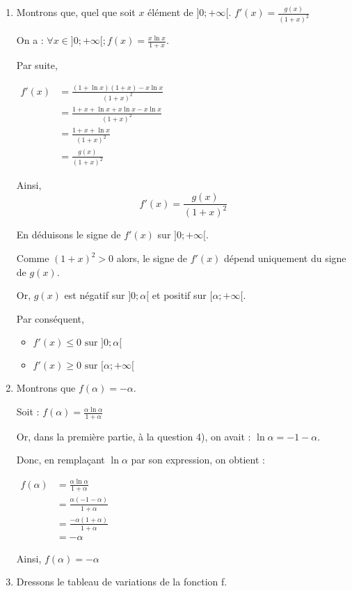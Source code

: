 \documentclass[12pt,a4paper]{article}
\begin{document}
\begin{enumerate}
\item Montrons que, quel que soit $x$ élément de $]0 ; +\infty[$. \(f'(x) = \frac{g(x)}{(1 + x)^2}\)

On a : $\forall x \in ]0 ; +\infty[ ; f(x) = \frac{x \ln x}{1 + x}$.

Par suite,

\(
\begin{aligned}
f'(x) &= \frac{(1 + \ln x)(1 + x) - x \ln x}{(1 + x)^2} \\
&= \frac{1 + x + \ln x + x \ln x - x \ln x}{(1 + x)^2} \\
&= \frac{1 + x + \ln x}{(1 + x)^2} \\
&= \frac{g(x)}{(1 + x)^2}
\end{aligned}
\)

Ainsi,
\[
\boxed{f'(x) = \frac{g(x)}{(1 + x)^2}}
\]

En déduisons le signe de $f'(x)$ sur $]0 ; +\infty[$.

Comme $(1 + x)^2 > 0$ alors, le signe de $f'(x)$ dépend uniquement du signe de $g(x)$.

Or, $g(x)$ est négatif sur $]0 ; \alpha[$ et positif sur $[\alpha ; +\infty[$.

Par conséquent,
\begin{itemize}
    \item \(f'(x) \leq 0 \text{ sur } ]0 ; \alpha[\)
    \item  \(f'(x) \geq 0 \text{ sur } [\alpha ; +\infty[\)
\end{itemize}

\item  Montrons que $f(\alpha) = -\alpha$.

Soit : 
\(f(\alpha) = \frac{\alpha \ln \alpha}{1 + \alpha}\)

Or, dans la première partie, à la question 4), on avait : $\ln \alpha = -1 - \alpha$.

Donc, en remplaçant $\ln \alpha$ par son expression, on obtient :

\(
\begin{aligned}
f(\alpha) &= \frac{\alpha \ln \alpha}{1 + \alpha}\\
&= \frac{\alpha (-1 - \alpha)}{1 + \alpha} \\
&= \frac{-\alpha(1 + \alpha)}{1 + \alpha} \\
&= -\alpha
\end{aligned}\)

Ainsi,
\(\boxed{f(\alpha) = -\alpha}\)

\item Dressons le tableau de variations de la fonction f.


\end{enumerate}
\end{document}
